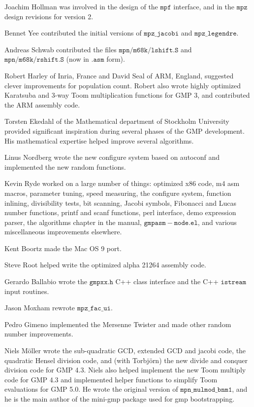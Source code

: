 \vpara
Joachim Hollman was involved in the design of the $\mathtt{mpf}$ interface, and in
the $\mathtt{mpz}$ design revisions for version 2.

\vpara
Bennet Yee contributed the initial versions of $\mathtt{mpz\_jacobi}$ and
$\mathtt{mpz\_legendre}$.

\vpara
Andreas Schwab contributed the files $\mathtt{mpn/m68k/lshift.S}$ and
$\mathtt{mpn/m68k/rshift.S}$ (now in $\mathtt{.asm}$ form).

\vpara
Robert Harley of Inria, France and David Seal of ARM, England, suggested clever
improvements for population count.  Robert also wrote highly optimized
Karatsuba and 3-way Toom multiplication functions for GMP 3, and contributed
the ARM assembly code.

\vpara
Torsten Ekedahl of the Mathematical department of Stockholm University provided
significant inspiration during several phases of the GMP development.  His
mathematical expertise helped improve several algorithms.

\vpara
Linus Nordberg wrote the new configure system based on autoconf and
implemented the new random functions.

\vpara
Kevin Ryde worked on a large number of things: optimized x86 code, m4 asm
macros, parameter tuning, speed measuring, the configure system, function
inlining, divisibility tests, bit scanning, Jacobi symbols, Fibonacci and Lucas
number functions, printf and scanf functions, perl interface, demo expression
parser, the algorithms chapter in the manual, $\mathtt{gmpasm-mode.el}$, and
various miscellaneous improvements elsewhere.

\vpara
Kent Boortz made the Mac OS 9 port.

\vpara
Steve Root helped write the optimized alpha 21264 assembly code.

\vpara
Gerardo Ballabio wrote the $\mathtt{gmpxx.h}$ C++ class interface and the C++
$\mathtt{istream}$ input routines.

\vpara
Jason Moxham rewrote $\mathtt{mpz\_fac\_ui}$.

\vpara
Pedro Gimeno implemented the Mersenne Twister and made other random number
improvements.

\vpara
Niels M\"oller wrote the sub-quadratic GCD, extended GCD and jacobi code, the
quadratic Hensel division code, and (with Torbj\"orn) the new divide and
conquer division code for GMP 4.3.  Niels also helped implement the new Toom
multiply code for GMP 4.3 and implemented helper functions to simplify Toom
evaluations for GMP 5.0.  He wrote the original version of $\mathtt{mpn\_mulmod\_bnm1}$, and
he is the main author of the mini-gmp package used for gmp bootstrapping.

